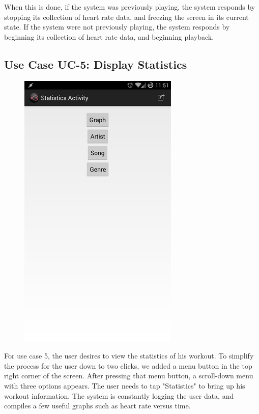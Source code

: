 \documentclass[letterpaper,english, 12pt]{scrreprt}
\begin{document}
When this is done, if the system was previously playing, the system responds by stopping its collection of heart rate data, and freezing the screen in its current state. 
If the system were not previously playing, the system responds by beginning its collection of heart rate data, and beginning playback.

\subsection{Use Case UC-5: Display Statistics}

\begin{figure}[H]
	\centering
	\includegraphics{img/Prelim_Design/5.png}\\
\end{figure}

For use case 5, the user desires to view the statistics of his workout.
To simplify the process for the user down to two clicks, we added a menu button in the top right corner of the screen.
After pressing that menu button, a scroll-down menu with three options appears.
The user needs to tap "Statistics" to bring up his workout information.
The system is constantly logging the user data, and compiles a few useful graphs such as heart rate versus time.
\end{document}
